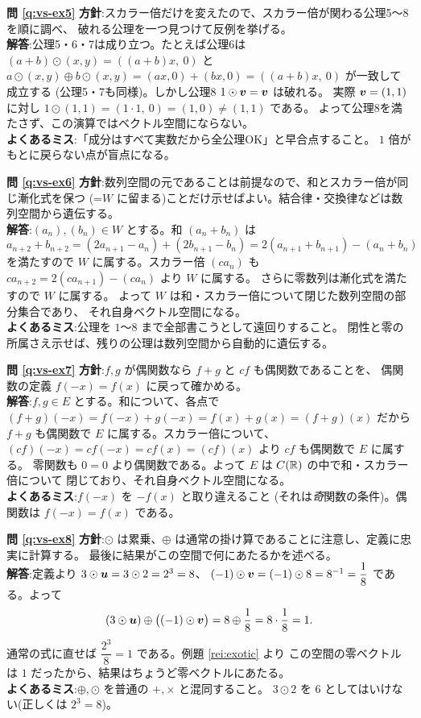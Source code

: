 \bigskip
\noindent\textbf{問 \ref{q:vs-ex5}}\quad
\textbf{方針}:スカラー倍だけを変えたので、スカラー倍が関わる公理5〜8を順に調べ、
破れる公理を一つ見つけて反例を挙げる。\\
\textbf{解答}:公理5・6・7は成り立つ。たとえば公理6は
$(a + b) \odot (x, y) = ((a+b)x,\ 0)$ と
$a \odot (x,y) \oplus b \odot (x,y) = (ax, 0) + (bx, 0) = ((a+b)x,\ 0)$ が一致して成立する
(公理5・7も同様)。しかし公理8 $1 \odot \bm{v} = \bm{v}$ は破れる。
実際 $\bm{v} = (1, 1)$ に対し $1 \odot (1, 1) = (1 \cdot 1,\ 0) = (1, 0) \ne (1, 1)$ である。
よって公理8を満たさず、この演算ではベクトル空間にならない。\\
\textbf{よくあるミス}:「成分はすべて実数だから全公理OK」と早合点すること。
$1$ 倍がもとに戻らない点が盲点になる。

\bigskip
\noindent\textbf{問 \ref{q:vs-ex6}}\quad
\textbf{方針}:数列空間の元であることは前提なので、和とスカラー倍が同じ漸化式を保つ
(=$W$ に留まる)ことだけ示せばよい。結合律・交換律などは数列空間から遺伝する。\\
\textbf{解答}:$(a_n), (b_n) \in W$ とする。和 $(a_n + b_n)$ は
\[
a_{n+2} + b_{n+2} = (2a_{n+1} - a_n) + (2b_{n+1} - b_n)
= 2(a_{n+1} + b_{n+1}) - (a_n + b_n)
\]
を満たすので $W$ に属する。スカラー倍 $(c a_n)$ も
$c a_{n+2} = 2(c a_{n+1}) - (c a_n)$ より $W$ に属する。
さらに零数列は漸化式を満たすので $W$ に属する。
よって $W$ は和・スカラー倍について閉じた数列空間の部分集合であり、
それ自身ベクトル空間になる。\\
\textbf{よくあるミス}:公理を $1$〜$8$ まで全部書こうとして遠回りすること。
閉性と零の所属さえ示せば、残りの公理は数列空間から自動的に遺伝する。

\bigskip
\noindent\textbf{問 \ref{q:vs-ex7}}\quad
\textbf{方針}:$f, g$ が偶関数なら $f + g$ と $cf$ も偶関数であることを、
偶関数の定義 $f(-x) = f(x)$ に戻って確かめる。\\
\textbf{解答}:$f, g \in E$ とする。和について、各点で
$(f + g)(-x) = f(-x) + g(-x) = f(x) + g(x) = (f + g)(x)$
だから $f + g$ も偶関数で $E$ に属する。スカラー倍について、
$(cf)(-x) = c f(-x) = c f(x) = (cf)(x)$ より $cf$ も偶関数で $E$ に属する。
零関数も $0 = 0$ より偶関数である。よって $E$ は $C(\mathbb{R})$ の中で和・スカラー倍について
閉じており、それ自身ベクトル空間になる。\\
\textbf{よくあるミス}:$f(-x)$ を $-f(x)$ と取り違えること
(それは\emph{奇}関数の条件)。偶関数は $f(-x) = f(x)$ である。

\bigskip
\noindent\textbf{問 \ref{q:vs-ex8}}\quad
\textbf{方針}:$\odot$ は累乗、$\oplus$ は通常の掛け算であることに注意し、定義に忠実に計算する。
最後に結果がこの空間で何にあたるかを述べる。\\
\textbf{解答}:定義より $3 \odot \bm{u} = 3 \odot 2 = 2^3 = 8$、
$(-1) \odot \bm{v} = (-1) \odot 8 = 8^{-1} = \dfrac{1}{8}$ である。よって
\[
(3 \odot \bm{u}) \oplus \bigl((-1) \odot \bm{v}\bigr)
= 8 \oplus \frac{1}{8} = 8 \cdot \frac{1}{8} = 1.
\]
通常の式に直せば $\dfrac{2^3}{8} = 1$ である。例題 \ref{rei:exotic} より
この空間の零ベクトルは $1$ だったから、結果はちょうど零ベクトルにあたる。\\
\textbf{よくあるミス}:$\oplus, \odot$ を普通の $+, \times$ と混同すること。
$3 \odot 2$ を $6$ としてはいけない(正しくは $2^3 = 8$)。

